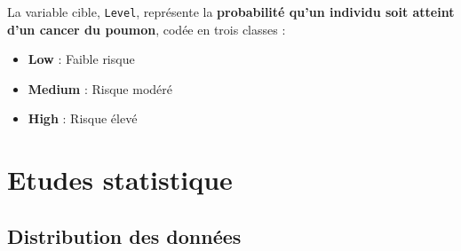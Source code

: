 \documentclass[a4paper,11pt]{article}
\begin{document}
\vspace{1em}

La variable cible, \texttt{Level}, représente la \textbf{probabilité qu'un individu soit atteint d’un cancer du poumon}, codée en trois classes : 

\begin{itemize}
  \item \textbf{Low} : Faible risque
  \item \textbf{Medium} : Risque modéré
  \item \textbf{High} : Risque élevé
\end{itemize}

\newpage

\section{Etudes statistique}

\subsection{Distribution des données}
\end{document}
